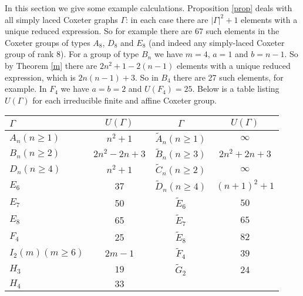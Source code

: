 \documentclass[a4paper,12pt]{article}
\theoremstyle{definition}
\begin{document}
In this section we give some example calculations. Proposition \ref{prop} deals with all simply laced Coxeter graphs $\Gamma$: in each case there are $|\Gamma|^2 + 1$ elements with a unique reduced expression. So for example there are 67 such elements in the Coxeter groups of types $A_8$, $D_8$ and $E_8$ (and indeed any simply-laced Coxeter group of rank 8). For a group of type $B_n$ we have  $m=4$, $a=1$ and $b=n-1$. So by Theorem \ref{m} there are 
$2n^2 + 1 - 2(n-1)$ elements with a unique reduced expression, which is $2n(n-1) + 3$. So in $B_4$ there are 27 such elements, for example. In $F_4$ we have $a = b = 2$ and $U(F_4) = 25$. Below is a table listing $U(\Gamma)$ for each irreducible finite and affine Coxeter group.
\begin{center}
\begin{tabular}{|l|c|c|c|} \hline $\Gamma$ & $U(\Gamma)$ & $\Gamma$ & $U(\Gamma)$\\
\hline
$A_n (n \geq 1)$ & $n^2 + 1$ & $\tilde A_n (n \geq 1)$ & $\infty$\\
$B_n (n \geq 2)$ & $2n^2 - 2n + 3$ & $\tilde B_n (n \geq 3)$ & $2n^2 + 2n + 3$ \\
$D_n (n \geq 4)$ & $n^2 + 1$  & $\tilde C_n (n \geq 2)$ & $\infty$\\
$E_6$ & 37 & $\tilde D_n (n \geq 4)$ & $(n+1)^2 + 1$\\
    $E_7$ & 50  & $\tilde E_6$ & $50$\\
$E_8$ & 65 & $\tilde E_7$ & $65$\\
$F_4$ & 25  & $\tilde E_8$ & $82$\\
$I_2(m) (m \geq 6)$ & $2m-1$ & $\tilde F_4$ & $39$\\
$H_3$ & $19$  & $\tilde G_2$ & 24\\
  $H_4$ & $33$ && \\ \hline
\end{tabular}
\end{center}


 
\end{document}
